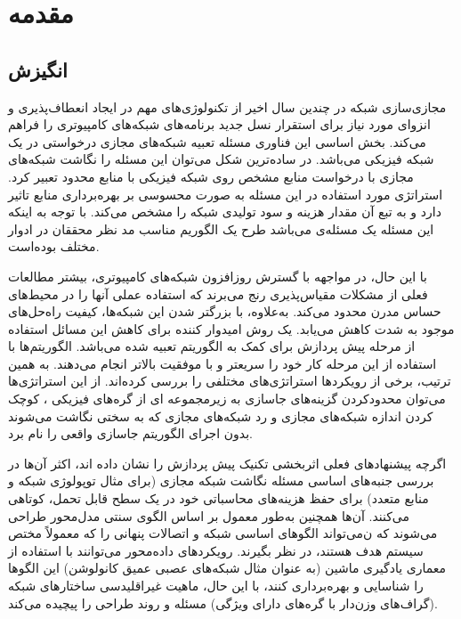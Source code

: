 
\chapter{مقدمه}
\section{انگیزش}

مجازی‌سازی شبکه در چندین سال اخیر از تکنولوژی‌های مهم در ایجاد \gls{انعطاف‌پذیری} و \gls{انزوا}ی مورد نیاز برای استقرار نسل جدید برنامه‌های شبکه‌های کامپیوتری را فراهم می‌کند. بخش اساسی این فناوری مسئله تعبیه شبکه‌های مجازی درخواستی
 در یک شبکه فیزیکی 
 می‌باشد. در ساده‌ترین شکل می‌توان این مسئله را نگاشت شبکه‌های مجازی با درخواست منابع مشخص روی شبکه فیزیکی با منابع محدود تعبیر کرد. استراتژی مورد استفاده در این مسئله به صورت محسوسی بر بهره‌برداری منابع تاثیر دارد و به تبع آن مقدار هزینه و سود تولیدی شبکه را مشخص می‌کند. با توجه به اینکه این مسئله یک مسئله‌ی 
 می‌باشد 
 \cite{vne_nphard}
	طرح یک الگوریم مناسب مد نظر محققان در ادوار مختلف بوده‌است. 
	\cite{survey_1}
	
با این حال، در مواجهه با گسترش روزافزون شبکه‌های کامپیوتری، بیشتر مطالعات فعلی از مشکلات مقیاس‌پذیری رنج می‌برند که استفاده عملی آنها را در محیط‌های حساس مدرن محدود می‌کند. به‌علاوه، با بزرگتر شدن این شبکه‌ها، کیفیت راه‌حل‌های موجود به شدت کاهش ‌می‌یابد.
یک روش امیدوار کننده برای کاهش این مسائل استفاده از مرحله پیش پردازش برای کمک به الگوریتم تعبیه شده  می‌باشد. الگوریتم‌ها با استفاده از این مرحله کار خود را سریعتر و با موفقیت بالاتر انجام می‌دهند. 
به همین ترتیب، برخی از رویکردها استراتژی‌های مختلفی را بررسی کرده‌اند. از این استراتژی‌ها می‌توان محدودکردن گزینه‌های جاسازی به زیرمجموعه ای از گره‌های فیزیکی 
\cite {neurovine} 
، کوچک کردن اندازه شبکه‌های مجازی
\cite {Wang_2019_Globecom} 
و رد شبکه‌های مجازی  که به سختی نگاشت می‌شوند بدون اجرای الگوریتم جاسازی واقعی
 \cite {Blenk_2016_CNSM}
  را نام برد.
  
  اگرچه پیشنهادهای فعلی اثربخشی تکنیک پیش پردازش را نشان داده اند، اکثر آن‌ها در بررسی جنبه‌های اساسی مسئله نگاشت شبکه مجازی (برای مثال توپولوژی شبکه و منابع متعدد) برای حفظ هزینه‌های محاسباتی خود در یک سطح قابل تحمل‌، کوتاهی می‌کنند.
  آن‌ها همچنین به‌طور معمول بر اساس الگوی سنتی مدل‌محور طراحی ‌می‌شوند که ن‌می‌تواند الگوهای اساسی  شبکه و اتصالات پنهانی را که معمولاً مختص سیستم هدف هستند‌، در نظر بگیرند.
  رویکردهای داده‌محور ‌می‌توانند با استفاده از معماری یادگیری ماشین (به عنوان مثال شبکه‌های عصبی عمیق کانولوشن) این الگوها را شناسایی و بهره‌برداری کنند، با این حال، ماهیت غیراقلیدسی ساختارهای شبکه (گراف‌های وزن‌دار با گره‌های دارای ویژگی)
\cite {graphNN_RL} 
  مسئله و روند طراحی را پیچیده می‌کند.
  
